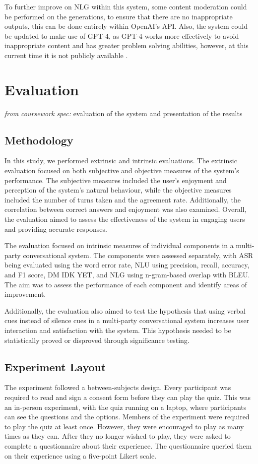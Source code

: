 \documentclass[hidelinks, 11pt]{article}
\begin{document}
To further improve on NLG within this system, some content moderation could be performed on the generations, to ensure that there are no inappropriate outputs, this can be done entirely within OpenAI's API.  Also, the system could be updated to make use of GPT-4, as GPT-4 works more effectively to avoid inappropriate content and has greater problem solving abilities, however, at this current time it is not publicly available \cite{GPT_4_2023,OpenAI_2023}.


\section{Evaluation}
\label{sec:evaluation}

\textit{from coursework spec:} evaluation of the system and presentation of the results

\subsection{Methodology}
\label{subsec:methodology}
In this study, we performed extrinsic and intrinsic evaluations. The extrinsic evaluation focused on both subjective and objective measures of the system's performance. The subjective measures included the user's enjoyment and perception of the system's natural behaviour, while the objective measures included the number of turns taken and the agreement rate. Additionally, the correlation between correct answers and enjoyment was also examined. Overall, the evaluation aimed to assess the effectiveness of the system in engaging users and providing accurate responses.

The evaluation focused on intrinsic measures of individual components in a multi-party conversational system. The components were assessed separately, with ASR being evaluated using the word error rate, NLU using precision, recall, accuracy, and F1 score, DM IDK YET, and NLG using n-gram-based overlap with BLEU. The aim was to assess the performance of each component and identify areas of improvement.

Additionally, the evaluation also aimed to test the hypothesis that using verbal cues instead of silence cues in a multi-party conversational system increases user interaction and satisfaction with the system. This hypothesis needed to be statistically proved or disproved through significance testing.
\subsection{Experiment Layout}
\label{subsec:experiment_layout}
The experiment followed a between-subjects design. Every participant was required to read and sign a consent form before they can play the quiz. This was an in-person experiment, with the quiz running on a laptop, where participants can see the questions and the options. Members of the experiment were required to play the quiz at least once. However, they were encouraged to play as many times as they can. After they no longer wished to play, they were asked to complete a questionnaire about their experience. The questionnaire queried them on their experience using a five-point Likert scale.
\end{document}
